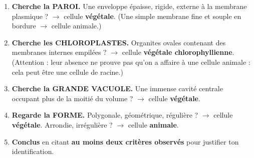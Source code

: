 \documentclass[11pt]{article}
\begin{document}
\begin{methode}
\begin{enumerate}
    \item \textbf{Cherche la PAROI.} Une enveloppe épaisse, rigide, externe à la membrane plasmique ? $\rightarrow$ cellule \textbf{végétale}. (Une simple membrane fine et souple en bordure $\rightarrow$ cellule animale.)
    \item \textbf{Cherche les CHLOROPLASTES.} Organites ovales contenant des membranes internes empilées ? $\rightarrow$ cellule \textbf{végétale chlorophyllienne}. (Attention : leur absence ne prouve pas qu'on a affaire à une cellule animale : cela peut être une cellule de racine.)
    \item \textbf{Cherche la GRANDE VACUOLE.} Une immense cavité centrale occupant plus de la moitié du volume ? $\rightarrow$ cellule \textbf{végétale}.
    \item \textbf{Regarde la FORME.} Polygonale, géométrique, régulière ? $\rightarrow$ cellule \textbf{végétale}. Arrondie, irrégulière ? $\rightarrow$ cellule \textbf{animale}.
    \item \textbf{Conclus} en citant \textbf{au moins deux critères observés} pour justifier ton identification.
\end{enumerate}
\end{methode}
\end{document}
